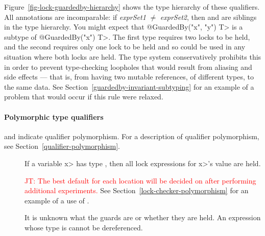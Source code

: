 Figure~\ref{fig-lock-guardedby-hierarchy} shows the type hierarchy of these
qualifiers.
All  annotations are incomparable:
if \emph{exprSet1} $\neq$ \emph{exprSet2}, then  and
 are siblings in the type hierarchy.
You might expect that
\<@GuardedBy({"x", "y"}) T> is a subtype of \<@GuardedBy({"x"}) T>.  The
first type requires two locks to be held, and the second requires only one
lock to be held and so could be used in any situation where both locks are
held.  The type system conservatively prohibits this in order to prevent
type-checking loopholes that would result from aliasing and side effects
--- that is, from having two mutable references, of different types, to the
same data. See
Section~\ref{guardedby-invariant-subtyping} for an example
of a problem that would occur if this rule were relaxed.


\paragraph{Polymorphic type qualifiers}

and
indicate qualifier polymorphism.  For a description of qualifier
polymorphism, see Section~\ref{qualifier-polymorphism}.

\begin{description}

\item[]
  If a variable \<x> has type , then all
  lock expressions for \<x>'s value are held.

  \textcolor{red}{JT: The best default for each location will be decided on after performing
  additional experiments.}
  See Section~\ref{lock-checker-polymorphism}
  for an example of a use of .

\item[]
  It is unknown what the guards are or whether they are held.
  An expression whose type is 
  cannot be dereferenced.

\end{description}

